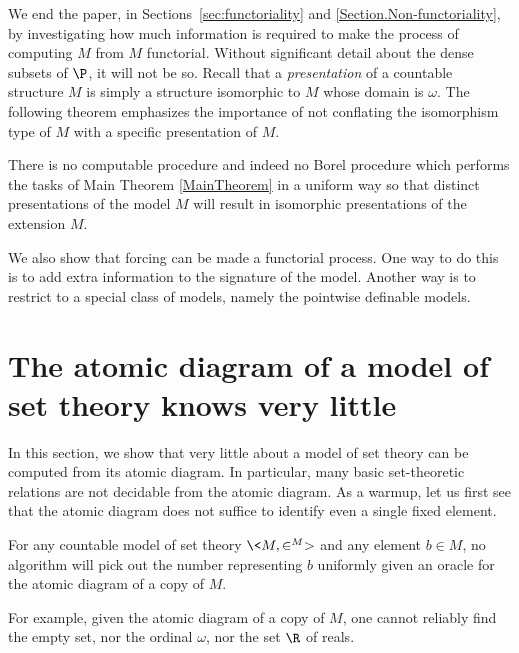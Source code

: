 \documentclass{amsart}
\begin{document}
 We end the paper, in Sections~\ref{sec:functoriality} and \ref{Section.Non-functoriality}, by investigating how much
 information is required to make the process of computing $M$ from $M$ functorial.  Without significant detail
 about the dense subsets of $\P$, it will not be so.  Recall that a \emph{presentation} of a countable structure $M$
 is simply a structure isomorphic to $M$ whose domain is $\omega$.  The following theorem emphasizes the importance of not conflating the isomorphism type of $M$ with a specific presentation of $M$.
 
 \begin{maintheorem}\label{MainTheorem.Nonfunctoriality}
   There is no computable procedure and indeed no Borel procedure which performs the tasks of Main Theorem \ref{MainTheorem} in a uniform way so that distinct presentations of the model $M$ will result in isomorphic presentations of the extension $M$.
 \end{maintheorem}
 
 We also show that forcing can be made a functorial process. One way to do this is to add extra information to the signature of the model. Another way is to restrict to a special class of models, namely the pointwise definable models.
 
 \section{The atomic diagram of a model of set theory knows very little}\label{Section.Atomic-diagram-knows-little}
 
 In this section, we show that very little about a model of set theory can be computed from its atomic diagram. In particular, many basic set-theoretic relations are not decidable from the atomic diagram. As a warmup, let us first see that the atomic diagram does not suffice to identify even a single fixed element.
 
 \begin{proposition}\label{Proposition.Atomic-diagram-knows-little}
  For any countable model of set theory $\<M,\in^M>$ and any element $b\in M$, no algorithm will pick out the number representing $b$ uniformly given an oracle for the atomic diagram of a copy of $M$.
 \end{proposition}
 
 For example, given the atomic diagram of a copy of $M$, one cannot reliably find the empty set, nor the ordinal $\omega$, nor the set $\R$ of reals.
 
\end{document}
